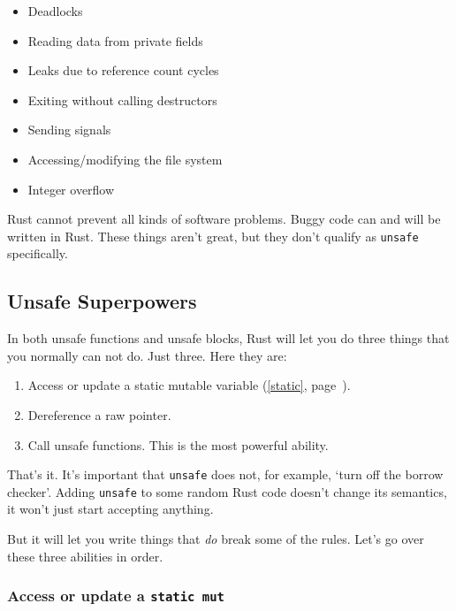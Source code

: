 \documentclass[a4paper,]{book}
\renewcommand*{\hyperref}[2][\ar]{%
  \def\ar{#2}%
  #2 (\autoref{#1}, page~\pageref{#1})}
\begin{document}
\begin{itemize}
\itemsep1pt\parskip0pt
\item
  Deadlocks
\item
  Reading data from private fields
\item
  Leaks due to reference count cycles
\item
  Exiting without calling destructors
\item
  Sending signals
\item
  Accessing/modifying the file system
\item
  Integer overflow
\end{itemize}

Rust cannot prevent all kinds of software problems. Buggy code can and
will be written in Rust. These things aren't great, but they don't
qualify as \texttt{unsafe} specifically.

\subsection{Unsafe Superpowers}\label{unsafe-superpowers}

In both unsafe functions and unsafe blocks, Rust will let you do three
things that you normally can not do. Just three. Here they are:

\begin{enumerate}
\def\labelenumi{\arabic{enumi}.}
\itemsep1pt\parskip0pt
\item
  Access or update a \hyperref[static]{static mutable variable}.
\item
  Dereference a raw pointer.
\item
  Call unsafe functions. This is the most powerful ability.
\end{enumerate}

That's it. It's important that \texttt{unsafe} does not, for example,
`turn off the borrow checker'. Adding \texttt{unsafe} to some random
Rust code doesn't change its semantics, it won't just start accepting
anything.

But it will let you write things that \emph{do} break some of the rules.
Let's go over these three abilities in order.

\subsubsection{\texorpdfstring{Access or update a
\texttt{static\ mut}}{Access or update a static mut}}\label{access-or-update-a-static-mut}
\end{document}
